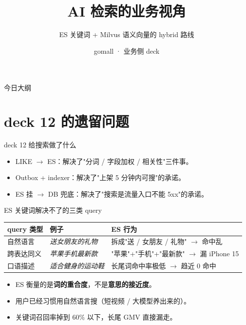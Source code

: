 

\title{AI 检索的业务视角}
\subtitle{ES 关键词 + Milvus 语义向量的 hybrid 路线}
\author{gomall · 业务侧 deck}
\date{}



\maketitle

\begin{frame}{今日大纲}
\tableofcontents
\end{frame}

\section{deck 12 的遗留问题}

\begin{frame}{deck 12 给搜索做了什么}
\begin{itemize}
  \item LIKE $\to$ ES：解决了"分词 / 字段加权 / 相关性"三件事。
  \item Outbox + indexer：解决了"上架 5 分钟内可搜"的承诺。
  \item ES 挂 $\to$ DB 兜底：解决了"搜索是流量入口不能 5xx"的承诺。
\end{itemize}
\vspace{2mm}
\end{frame}

\begin{frame}{ES 关键词解决不了的三类 query}
\begin{tabular}{@{}lll@{}}
\toprule
query 类型 & 例子 & ES 行为 \\
\midrule
自然语言   & \textit{送女朋友的礼物}    & 拆成"送 / 女朋友 / 礼物" $\to$ 命中乱 \\
跨表达同义 & \textit{苹果手机最新款}    & "苹果"+"手机"+"最新款" $\to$ 漏 iPhone 15 \\
口语描述   & \textit{适合健身的运动鞋} & 长尾词命中率极低 $\to$ 趋近 0 命中 \\
\bottomrule
\end{tabular}
\vspace{2mm}
\begin{itemize}
  \item ES 衡量的是\textbf{词的重合度}，不是\textbf{意思的接近度}。
  \item 用户已经习惯用自然语言搜（短视频 / 大模型养出来的）。
  \item 关键词召回率掉到 60\% 以下，长尾 GMV 直接漏走。
\end{itemize}
\end{frame}

